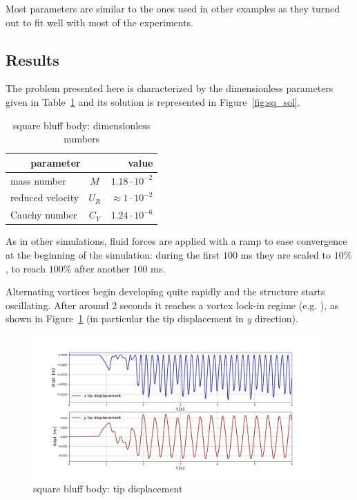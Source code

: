 Most parameters are similar to the ones used in other examples as they turned out to fit well with most of the experiments. 

\subsection{Results}

The problem presented here is characterized by the dimensionless parameters given in Table~\ref{table:sq-adim} and its solution is represented in Figure~\ref{fig:sq_sol}.

\begin{table}[!htb]
	\begin{center}
		\begin{tabular}{ l c | r } 
			\multicolumn{2}{c|}{parameter} & value   \\ 
			\hline
			mass number  & $M$ & $ 1.18\cdot 10^{-2}$     \\
			reduced velocity & $U_R$ & $ \approx 1\cdot 10^{-2}$  \\
			Cauchy number  & $C_Y$ & $  1.24 \cdot 10^{-6}$  \\			
		\end{tabular}
	\end{center}
	\caption{square bluff body: dimensionless numbers}
	\label{table:sq-adim}
\end{table}

As in other simulations, fluid forces are applied with a ramp to ease convergence at the beginning of the simulation: during the first $100$ \si{ms} they are scaled to $10\%$, to reach $100\%$ after another $100$ \si{ms}.

Alternating vortices begin developing quite rapidly and the structure starts oscillating. After around 2 seconds it reaches a vortex lock-in regime (e.g. \cite{hong2001fluid}), as shown in Figure~\ref{fig:sq_displacement} (in particular the tip displacement in \textit{y} direction).



\begin{figure}[htbp!]
	\centering
	\includegraphics[width=0.98\textwidth, trim=20 20 20 50, clip]{images/sq-cyl/disp_sq.png}
	\caption{square bluff body: tip displacement}
	\label{fig:sq_displacement}
\end{figure}

